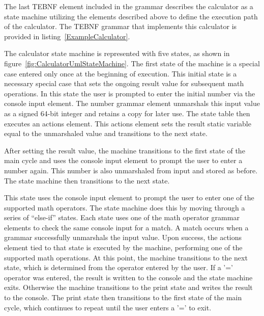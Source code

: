 \indent
The last TEBNF element included in the grammar describes the calculator as a state machine utilizing the elements described above to define the execution path of the calculator.  The TEBNF grammar that implements this calculator is provided in listing~\ref{ExampleCalculator}.

\indent
The calculator state machine is represented with five states, as shown in figure~\ref{fig:CalculatorUmlStateMachine}.  The first state of the machine is a special case entered only once at the beginning of execution.  This initial state is a necessary special case that sets the ongoing result value for subsequent math operations.  In this state the user is prompted to enter the initial number via the console input element.  The number grammar element unmarshals this input value as a signed 64-bit integer and retains a copy for later use.  The state table then executes an actions element.  This actions element sets the result static variable equal to the unmarshaled value and transitions to the next state.

\indent
After setting the result value, the machine transitions to the first state of the main cycle and uses the console input element to prompt the user to enter a number again.  This number is also unmarshaled from input and stored as before.  The state machine then transitions to the next state.

\indent
This state uses the console input element to prompt the user to enter one of the supported math operators.  The state machine does this by moving through a series of “else-if” states.  Each state uses one of the math operator grammar elements to check the same console input for a match.  A match occurs when a grammar successfully unmarshals the input value.  Upon success, the actions element tied to that state is executed by the machine, performing one of the supported math operations.  At this point, the machine transitions to the next state, which is determined from the operator entered by the user.  If a '=' operator was entered, the result is written to the console and the state machine exits.  Otherwise the machine transitions to the print state and writes the result to the console.  The print state then transitions to the first state of the main cycle, which continues to repeat until the user enters a '=' to exit.

